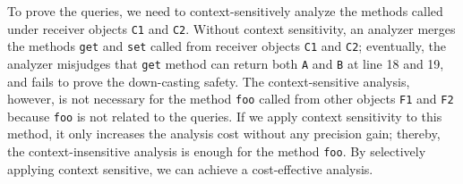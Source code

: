 \begin{comment}
To prove the queries, we needs to context sensitively analyze the methods
called under receiver objects {\tt C1} and {\tt C2} .
Without context sensitivity, the methods {\tt get} and {\tt
  set} called from receiver
objects {\tt C1} and {\tt C2} are merged; thereby, {\tt get} method
returns both {\tt A} and {\tt B} at line 18 and 19.
Meanwhile, method {\tt foo} called from other objects {\tt C1} and {\tt C2}
need to be analyzed context-insensitively
because the method is not related with the queries;
applying context sensitivity to the method increases analysis
cost without precision gain.
\end{comment}
To prove the queries, we need to context-sensitively analyze the methods called under receiver objects {\tt C1} and {\tt C2}.
Without context sensitivity, an analyzer merges the methods {\tt get} and {\tt set} called from receiver objects {\tt C1} and {\tt C2}; 
eventually, the analyzer misjudges that {\tt get} method can return both {\tt A} and {\tt B} at line 18 and 19, and fails to prove the down-casting safety.
The context-sensitive analysis, however, is not necessary for the method {\tt foo} called from other objects {\tt F1} and {\tt F2}
because {\tt foo} is not related to the queries.
If we apply context sensitivity to this method, it only increases the analysis cost without any precision gain;
thereby, the context-insensitive analysis is enough for the method {\tt foo}.
By selectively applying context sensitive, we can achieve a cost-effective analysis.

